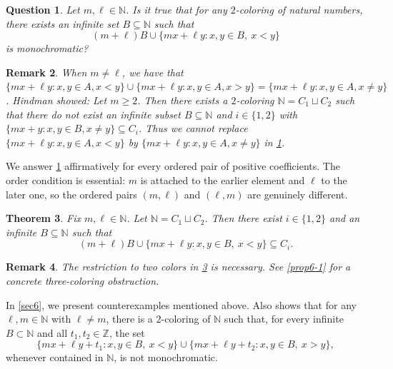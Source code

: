\documentclass[reqno,12pt]{amsart}
\newtheorem{thm}{Theorem}[section]
\newtheorem{ques}[thm]{Question}
\newtheorem{rem}[thm]{Remark}
\def \N {\mathbb N}
\numberwithin{equation}{section}
\begin{document}
\begin{ques}\label{q2}
	Let $m,\ell\in \N$. Is it true that for any $2$-coloring of natural numbers, there exists an infinite set $B\subseteq \N$ such that
	\begin{equation}\label{eq:weighted-target}
	(m+\ell)B\cup\{mx+\ell y:x,y\in B,\ x<y\}
	\end{equation}
	is monochromatic?
\end{ques}

\begin{rem}\label{rem1.6}
  When $m\neq \ell$, we have that
  $\{mx+\ell y:x,y\in A,x<y\}\cup \{mx+\ell y:x,y\in A,x>y\}=\{mx+\ell y:x,y\in A,x\neq y\}$.
  Hindman \cite[Theorem~2.11]{Neil79} showed: Let $m\ge 2$. Then there exists a $2$-coloring $\N=C_1\sqcup C_2$ such that there do not exist an infinite subset $B\subseteq \N$ and $i\in \{1,2\}$ with $\{mx+y: x,y\in B,x\neq y\}\subseteq C_i$. Thus we cannot replace $\{mx+\ell y:x,y\in A,x<y\}$ by $\{mx+\ell y:x,y\in A,x\neq y\}$ in \cref{q2}.


\end{rem}

We answer \cref{q2} affirmatively for every ordered pair of positive
coefficients.  The order condition is essential: $m$ is attached to the
earlier element and $\ell$ to the later one, so the ordered pairs $(m,\ell)$
and $(\ell,m)$ are genuinely different.

\begin{thm}\label{main2}
	Fix $m,\ell\in\N$. Let $\N=C_1\sqcup C_2$. Then there exist
	$i\in\{1,2\}$ and an infinite $B\subseteq\N$ such that
	\[
	(m+\ell)B\cup\{mx+\ell y:x,y\in B,\ x<y\}\subseteq C_i.
	\]
\end{thm}



\begin{rem}
	The restriction to two colors in \cref{main2} is necessary.  See
	\cref{prop6-1} for a concrete three-coloring obstruction.
\end{rem}

In
\cref{sec6}, we present counterexamples mentioned above. Also
 shows that for any $\ell,m\in \N$ with $\ell\neq m$, there is a $2$-coloring of
$\N$ such that, for every infinite $B\subset\N$ and all
$t_1,t_2\in\mathbb Z$, the set
\[
\{mx+\ell y+t_1:x,y\in B,\ x<y\}
\cup
\{mx+\ell y+t_2:x,y\in B,\ x>y\},
\]
whenever contained in $\N$, is not monochromatic.
\end{document}
